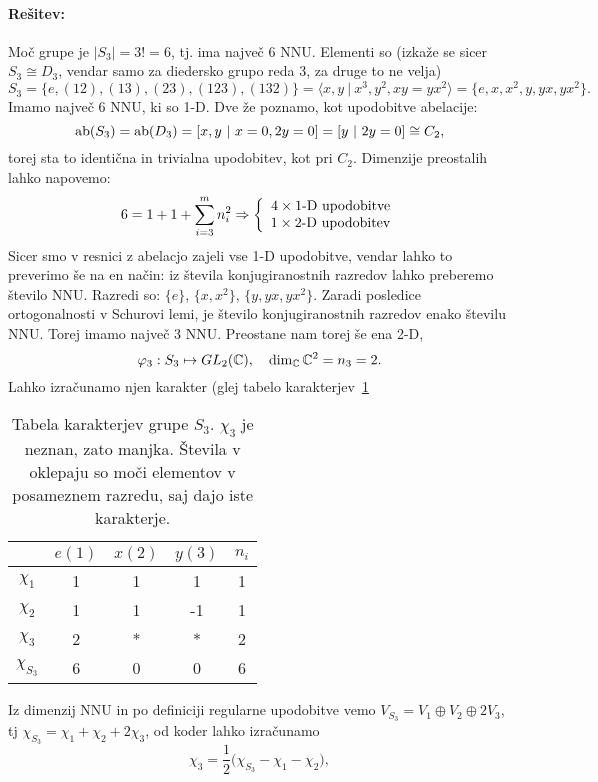 \begin{zgled}
	\paragraph{Re\v sitev:}
	Mo\v c grupe je $|S_3| = 3! = 6$, tj. ima najve\v c 6 NNU. Elementi so (izka\v ze se sicer $S_3 \cong D_3$, vendar samo za
	diedersko grupo reda 3, za druge to ne velja)
	\[
		S_3 = \{e, (12), (13), (23), (123), (132)\} = \langle x,y\ |\ x^3, y^2, xy = yx^2\rangle = \{e, x, x^2, y, yx, yx^2\}.
	\]
	Imamo najve\v c 6 NNU, ki so 1-D. Dve \v ze poznamo, kot upodobitve abelacije:
	\[
		\operatorname{ab} (S_3) = \operatorname{ab} (D_3) = [x, y\ |\ x = 0, 2y = 0] = [y\ |\ 2y = 0] \cong C_2,
	\]
	torej sta to identi\v cna in trivialna upodobitev, kot pri $C_2$. Dimenzije preostalih
	lahko napovemo:
	\[
		6 = 1 + 1 + \sum_{i = 3}^m n_i^2 \Rightarrow \left\{
		\begin{array}{rl}
			4 \times \text{1-D upodobitve} \\
			1 \times \text{2-D upodobitev}
		\end{array}\right.
	\]
	Sicer smo v resnici z abelacjo zajeli vse 1-D upodobitve, vendar lahko to preverimo \v se na en na\v cin: iz \v stevila
	konjugiranostnih razredov lahko preberemo \v stevilo NNU. Razredi so: $\{e\}$, $\{x, x^2\}$, $\{y, yx, yx^2\}$. Zaradi
	posledice ortogonalnosti v Schurovi lemi, je \v stevilo konjugiranostnih razredov enako \v stevilu NNU. Torej imamo najve\v c
	3 NNU. Preostane nam torej \v se ena 2-D,
	\[
		\varphi_3 : S_3 \mapsto GL_2 (\mathbb{C}), \quad \dim_{\mathbb{C}} \mathbb{C}^2 = n_3 = 2.
	\]
	Lahko izra\v cunamo njen karakter (glej tabelo karakterjev~\ref{karakterji}
	\begin{table}[H]\centering
		\caption{Tabela karakterjev grupe $S_3$. $\chi_3$ je neznan, zato manjka. \v Stevila v oklepaju so
			mo\v ci elementov v posameznem razredu, saj dajo iste karakterje.}
		\begin{tabular}{c | c c c | c}
			& $e (1)$ & $x (2)$ & $y (3)$ & $n_i$ \\
			\hline
			$\chi_1$ & 1 & 1 & 1 & 1 \\
			$\chi_2$ & 1 & 1 &-1 & 1 \\
			$\chi_3$ & 2 & * & * & 2 \\
			\hline
			$\chi_{S_3}$ & 6 & 0 & 0 & 6
		\end{tabular}
		\label{karakterji}
	\end{table}
	Iz dimenzij NNU in po definiciji regularne upodobitve vemo
	$V_{S_3} = V_1 \oplus V_2 \oplus 2V_3$, tj $\chi_{S_3} = \chi_1 + \chi_2 + 2\chi_3$, od koder lahko izra\v cunamo
	\[
		\chi_3 = \frac{1}{2}\big(\chi_{S_3} - \chi_1 - \chi_2\big),
\]
\end{zgled}
